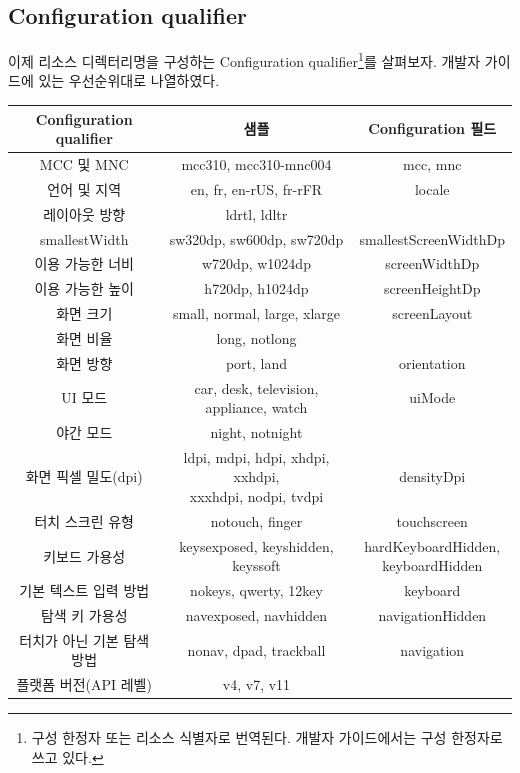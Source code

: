 \subsection{Configuration qualifier}
이제 리소스 디렉터리명을 구성하는 Configuration qualifier\footnote{구성 한정자 또는 리소스 식별자로 번역된다. 개발자 가이드에서는 구성 한정자로 쓰고 있다.}를 살펴보자. 개발자 가이드에 있는 우선순위대로 나열하였다.
\begin{longtable}{|c|c|c|}\hline
Configuration qualifier & 샘플 & Configuration 필드 \\ \hline
MCC 및 MNC	& mcc310, mcc310-mnc004  & mcc, mnc \\ \hline
언어 및 지역 & en, fr, en-rUS, fr-rFR & locale \\ \cline{1-2}
레이아웃 방향	& ldrtl, ldltr & \\ \hline
smallestWidth & sw320dp, sw600dp, sw720dp & smallestScreenWidthDp \\ \hline
이용 가능한 너비 & w720dp, w1024dp & screenWidthDp \\ \hline
이용 가능한 높이 & h720dp, h1024dp & screenHeightDp \\ \hline
화면 크기 & small, normal, large, xlarge & screenLayout \\  \cline{1-2}
화면 비율 & long, notlong & \\ \hline
화면 방향 & port, land & orientation \\ \hline
UI 모드	& car, desk, television, appliance, watch & uiMode\\ \cline{1-2}
야간 모드	 & night, notnight &  \\ \hline
화면 픽셀 밀도(dpi) &	\makecell{ldpi, mdpi, hdpi, xhdpi, xxhdpi, \\ xxxhdpi, nodpi, tvdpi} & densityDpi\\ \hline
터치 스크린 유형 &	notouch, finger	& touchscreen \\ \hline
키보드 가용성 & keysexposed, keyshidden, keyssoft	& \makecell{hardKeyboardHidden, \\ keyboardHidden} \\ \hline
기본 텍스트 입력 방법	& nokeys, qwerty, 12key & keyboard \\ \hline
탐색 키 가용성 & navexposed, navhidden	 & navigationHidden \\ \hline
터치가 아닌 기본 탐색 방법 & nonav, dpad, trackball & navigation \\ \hline
플랫폼 버전(API 레벨) & v4, v7, v11 & \\ \hline
\end{longtable}

